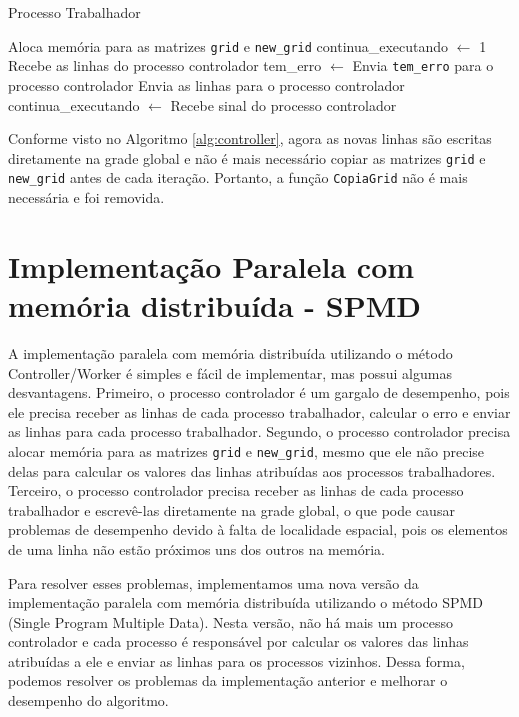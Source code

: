 \documentclass[conference]{IEEEtran}
\begin{document}
\begin{algorithm}[H]
    \caption{Processo Trabalhador}
    \begin{algorithmic}[1]
        \State Aloca memória para as matrizes \texttt{grid} e \texttt{new\_grid}
        \State continua\_executando $\gets$ 1
        \State Recebe as linhas do processo controlador
        \State tem\_erro $\gets$ 
        \State Envia \texttt{tem\_erro} para o processo controlador
        \State Envia as linhas para o processo controlador
        \State continua\_executando $\gets$ Recebe sinal do processo controlador
        \EndWhile
        \EndFunction
    \end{algorithmic}
    \label{alg:worker}
\end{algorithm}

Conforme visto no Algoritmo \ref{alg:controller}, agora as novas linhas são escritas diretamente na grade global e não é mais necessário copiar as matrizes \texttt{grid} e \texttt{new\_grid} antes de cada iteração. Portanto, a função \texttt{CopiaGrid} não é mais necessária e foi removida.

\section{Implementação Paralela com memória distribuída - SPMD}

A implementação paralela com memória distribuída utilizando o método Controller/Worker é simples e fácil de implementar, mas possui algumas desvantagens. Primeiro, o processo controlador é um gargalo de desempenho, pois ele precisa receber as linhas de cada processo trabalhador, calcular o erro e enviar as linhas para cada processo trabalhador. Segundo, o processo controlador precisa alocar memória para as matrizes \texttt{grid} e \texttt{new\_grid}, mesmo que ele não precise delas para calcular os valores das linhas atribuídas aos processos trabalhadores. Terceiro, o processo controlador precisa receber as linhas de cada processo trabalhador e escrevê-las diretamente na grade global, o que pode causar problemas de desempenho devido à falta de localidade espacial, pois os elementos de uma linha não estão próximos uns dos outros na memória.

Para resolver esses problemas, implementamos uma nova versão da implementação paralela com memória distribuída utilizando o método SPMD (Single Program Multiple Data). Nesta versão, não há mais um processo controlador e cada processo é responsável por calcular os valores das linhas atribuídas a ele e enviar as linhas para os processos vizinhos. Dessa forma, podemos resolver os problemas da implementação anterior e melhorar o desempenho do algoritmo.
\end{document}
